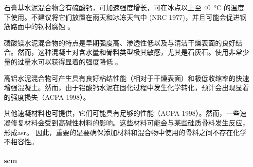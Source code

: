 石膏基水泥混合物含有硫酸钙，可加速强度增长，可在冰点以上至 \qty{40}{\celsius} 的温度下使用。不建议将它们放置在雨天和冰冻天气中 (NRC 1977)，并且可能会促进钢筋路面中的钢材腐蚀 \cite{mojab1993i}。

磷酸镁水泥混合物的特点是早期强度高、渗透性低以及与清洁干燥表面的良好结合。然而，这种混凝土对含水量和骨料类型极其敏感，尤其是石灰石。使用非常少量的过量水可以获得显着的强度降低 \cite{mojab1993i}。

高铝水泥混合物可产生具有良好粘结性能（相对于干燥表面）和极低收缩率的快速增强混凝土。然而，由于铝酸钙水泥在固化过程中发生化学转化，预计会出现显着的强度损失（ACPA 1998）。

其他速凝材料也可提供，它们可能具有足够的性能（ACPA 1998）。然而，一些速凝修复材料会受到高碱性材料的影响。这些材料可能会与某些硅质骨料发生反应，形成\acrfull*{asr}。 因此，重要的是要确保添加材料和混合物中使用的骨料之间不存在化学不相容性。

\paragraph{\acrfull*{scm}}

